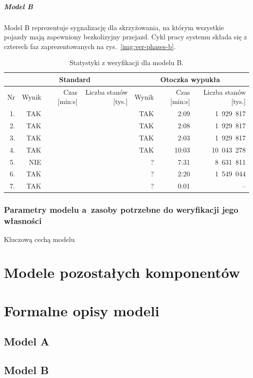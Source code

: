 \documentclass{pracamgr}
\newcommand{\imgr}[1]{rys.~\ref{#1}}
\theoremstyle{plain}
\begin{document}
\paragraph{Model B} Model B reprezentuje sygnalizację dla
skrzyżowania, na którym wszystkie pojazdy mają zapewniony bezkolizyjny
przejazd. Cykl pracy systemu składa się z czterech faz
zaprezentowanych na \imgr{img:ver-phases-b}.

\begin{table}
  \centering
  \begin{tabular}{|r||r|r|r||r|r|r||}
    \hline
    & \multicolumn{3}{c||}{\bf Standard} & \multicolumn{3}{c||}{\bf
      Otoczka wypukła} \\ \hline
    Nr   & Wynik & Czas [min:s] & Liczba stanów [tys.] & Wynik & Czas [min:s] &
    Liczba stanów [tys.] \\ \hline
    1. & TAK &  &  & TAK  & 2:09  &  1~929~817 \\
    2. & TAK &  &  & TAK  & 2:08  &  1~929~817 \\
    3. & TAK &  &  & TAK  & 2:03  &  1~929~817 \\
    4. & TAK &  &  & TAK  & 10:03 & 10~043~278 \\
    5. & NIE &  &  & ?    & 7:31  &  8~631~811 \\
    6. & TAK &  &  & ?    & 2:20  &  1~549~044 \\
    7. & TAK &  &  & ?    & 0:01  &       -- 
    \\\hline
  \end{tabular}
  \caption{Statystyki z weryfikacji dla modelu B.}
  \label{tab:ver-stats-b}
\end{table}

\subsection{Parametry modelu a~zasoby potrzebne do weryfikacji jego
  własności}
Kluczową cechą modelu 


\appendix
\chapter{Modele pozostałych komponentów}
\label{app:other-models}
\chapter{Formalne opisy modeli}
\label{app:descriptions}
\section{Model A}
\section{Model B}
{}

\end{document}
